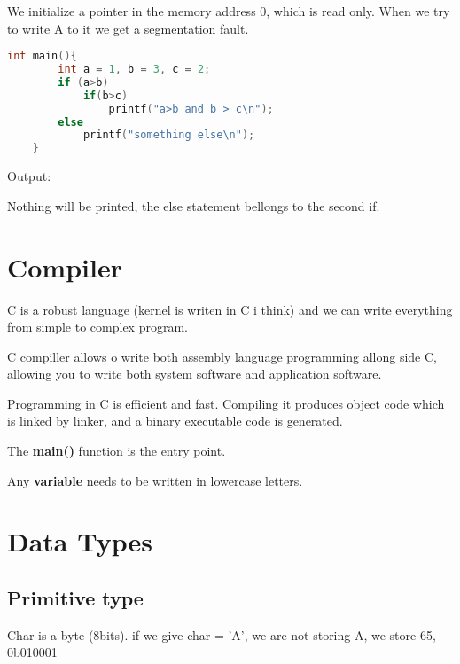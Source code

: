 \documentclass[12pt]{article}
\begin{document}
We initialize a pointer in the memory address 0, which is read only. When we try to write A to it we get a segmentation fault.

\vspace{10cm}

\begin{lstlisting}[language=C, title=nested if]
	int main(){
		int a = 1, b = 3, c = 2;
		if (a>b)
			if(b>c)
				printf("a>b and b > c\n");
		else
			printf("something else\n");
	}
\end{lstlisting}
Output: \textbf{}

Nothing will be printed, the else statement bellongs to the second if.

\newpage

\section{Compiler}
C is a robust language (kernel is writen in C i think) and we can write everything from simple to complex program.

\vspace{2mm}

C compiller allows o write both assembly language programming allong side C, allowing you to write both system software and application software. 

\vspace{2mm}

Programming in C is efficient and fast. Compiling it produces object code which is linked by linker, and a binary executable code is generated. 

\vspace{2mm}

The \textbf{main()} function is the entry point.

\vspace{2mm}

Any \textbf{variable} needs to be written in lowercase letters.

\newpage

\section{Data Types}

\subsection{Primitive type}%
\label{sub:Primitive type}
Char is a byte (8bits).
if we give char = 'A', we are not storing A, we store 65, 0b010001
\end{document}
